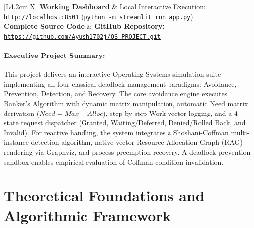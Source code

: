 \documentclass[11pt,a4paper]{article}
\begin{document}
\begin{table}[h!]
\centering
\small
\renewcommand{\arraystretch}{1.3}
\begin{tabularx}{\textwidth}{|L{4.2cm}|X|}
\hline
{}
\textbf{Working Dashboard} & Local Interactive Execution: \texttt{http://localhost:8501} (\texttt{python -m streamlit run app.py}) \\
\hline
{}
\textbf{Complete Source Code} & \textbf{GitHub Repository:} \href{https://github.com/Ayush1702j/OS_PROJECT.git}{\texttt{https://github.com/Ayush1702j/OS\_PROJECT.git}} \\
\hline
\end{tabularx}
\end{table}

\paragraph{Executive Project Summary:}
This project delivers an interactive Operating Systems simulation suite implementing all four classical deadlock management paradigms: Avoidance, Prevention, Detection, and Recovery. The core avoidance engine executes Banker's Algorithm with dynamic matrix manipulation, automatic Need matrix derivation ($Need = Max - Alloc$), step-by-step Work vector logging, and a 4-state request dispatcher (Granted, Waiting/Deferred, Denied/Rolled Back, and Invalid). For reactive handling, the system integrates a Shoshani-Coffman multi-instance detection algorithm, native vector Resource Allocation Graph (RAG) rendering via Graphviz, and process preemption recovery. A deadlock prevention sandbox enables empirical evaluation of Coffman condition invalidation.

\section{Theoretical Foundations and Algorithmic Framework}
\end{document}
